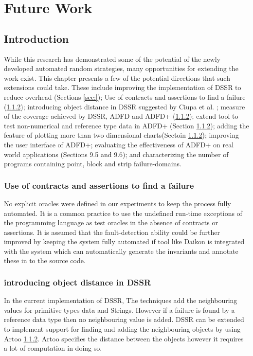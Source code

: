 
\chapter{Future Work}
\label{chap:futureWork}

\section{Introduction}\label{sec:intro8}
	
While this research has demonstrated some of the potential of the newly developed automated random strategies, many opportunities for extending the work exist. This chapter presents a few of the potential directions that such extensions could take. These include improving the implementation of DSSR to reduce overhead (Sections \ref{sec:}); Use of contracts and assertions to find a failure (\ref{}); introducing object distance in DSSR suggested by Ciupa et al. \cite{}; measure of the coverage achieved by DSSR, ADFD and ADFD+ (\ref{}); extend tool to test non-numerical and reference type data in ADFD+ (Section \ref{}); adding the feature of plotting more than two dimensional charts(Sectoin \ref{}); improving the user interface of ADFD+; evaluating the effectiveness of ADFD+ on real world applications (Sections 9.5 and 9.6); and characterizing the number of programs containing point, block and strip failure-domains.
	
\subsection{Use of contracts and assertions to find a failure}
No explicit oracles were defined in our experiments to keep the process fully automated. It is a common practice to use the undefined run-time exceptions of the programming language as test oracles in the absence of contracts or assertions. It is assumed that the fault-detection ability could be further improved by keeping the system fully automated if tool like Daikon is integrated with the system which can automatically generate the invariants and annotate these in to the source code.

\subsection{introducing object distance in DSSR}
In the current implementation of DSSR, The techniques add the neighbouring values for primitive types data and Strings. However if a failure is found by a reference data type then no neighbouring value is added. DSSR can be extended to implement support for finding and adding the neighbouring objects by using Artoo \ref{}. Artoo specifies the distance between the objects however it requires a lot of computation in doing so.  



